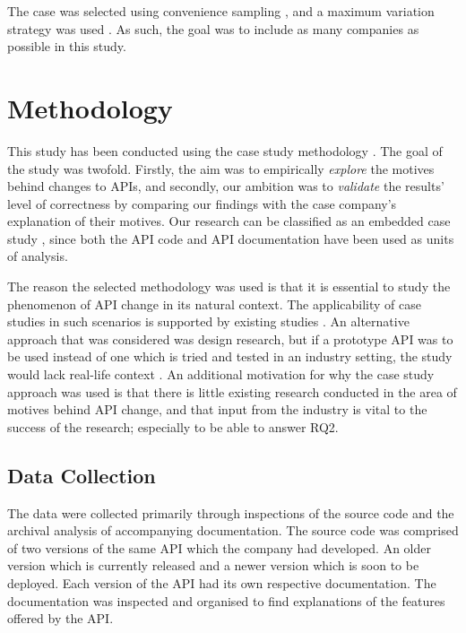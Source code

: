 \documentclass[10pt,twocolumn]{article}
\begin{document}

The case was selected using convenience sampling \cite{flyvbjerg2006five}, and a maximum variation strategy was used \cite{benbasat1987case}. As such, the goal was to include as many companies as possible in this study.



\section{Methodology}
This study has been conducted using the case study methodology \cite{runeson2009guidelines}. The goal of the study was twofold. Firstly, the aim was to empirically \textit{explore} the motives behind changes to APIs, and secondly, our ambition was to \textit{validate} the results' level of correctness by comparing our findings with the case company's explanation of their motives. Our research can be classified as an embedded case study \cite{yin2013case}, since both the API code and API documentation have been used as units of analysis. 

The reason the selected methodology was used is that it is essential to study the phenomenon of API change in its natural context. The applicability of case studies in such scenarios is supported by existing studies \cite{runeson2009guidelines} \cite{benbasat1987case} \cite{yin2013case} \cite{robson2002real}. An alternative approach that was considered was design research, but if a prototype API was to be used instead of one which is tried and tested in an industry setting, the study would lack real-life context \cite{runeson2009guidelines}. An additional motivation for why the case study approach was used is that there is little existing research conducted in the area of motives behind API change, and that input from the industry is vital to the success of the research; especially to be able to answer RQ2. 

\subsection{Data Collection}
The data were collected primarily through inspections of the source code and the archival analysis of accompanying  documentation. The source code was comprised of two versions of the same API which the company had developed. An older version which is currently released and a newer version which is soon to be deployed. Each version of the API had its own respective documentation. The documentation was inspected and organised to find explanations of the features offered by the API.
\end{document}
